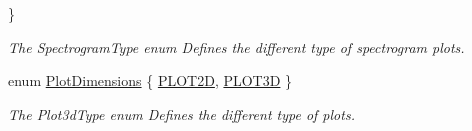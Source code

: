 \begin{DoxyCompactItemize}
 \}
\begin{DoxyCompactList}\small\item\em The Spectrogram\-Type enum Defines the different type of spectrogram plots. \end{DoxyCompactList}\item 
enum \hyperlink{group___scope_plugin_ga51d68dee7f98e408c8929a70cc78931d}{Plot\-Dimensions} \{ \hyperlink{group___scope_plugin_gga51d68dee7f98e408c8929a70cc78931da8aa50aacb48cd4541c8b865ea21a9776}{P\-L\-O\-T2\-D}, 
\hyperlink{group___scope_plugin_gga51d68dee7f98e408c8929a70cc78931da03290a428467402632eee034b634aa93}{P\-L\-O\-T3\-D}
 \}
\begin{DoxyCompactList}\small\item\em The Plot3d\-Type enum Defines the different type of plots. \end{DoxyCompactList}\end{DoxyCompactItemize}

